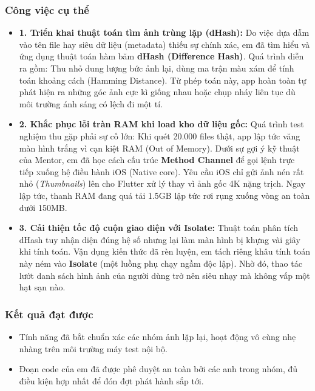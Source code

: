 \documentclass[12pt, a4paper]{article}
\begin{document}
\subsubsection{Công việc cụ thể}
\begin{itemize}
    \item \textbf{1. Triển khai thuật toán tìm ảnh trùng lặp (dHash):} 
    Do việc dựa dẫm vào tên file hay siêu dữ liệu (metadata) thiếu sự chính xác, em đã tìm hiểu và ứng dụng thuật toán hàm băm \textbf{dHash (Difference Hash)}. Quá trình diễn ra gồm: Thu nhỏ dung lượng bức ảnh lại, dùng ma trận màu xám để tính toán khoảng cách (Hamming Distance). Từ phép toán này, app hoàn toàn tự phát hiện ra những góc ảnh cực kì giống nhau hoặc chụp nháy liên tục dù môi trường ánh sáng có lệch đi một tí.
    
    \item \textbf{2. Khắc phục lỗi tràn RAM khi load kho dữ liệu gốc:} 
    Quá trình test nghiệm thu gặp phải sự cố lớn: Khi quét 20.000 files thật, app lập tức văng màn hình trắng vì cạn kiệt RAM (Out of Memory). Dưới sự gợi ý kỹ thuật của Mentor, em đã học cách cấu trúc \textbf{Method Channel} để gọi lệnh trực tiếp xuống hệ điều hành iOS (Native core). Yêu cầu iOS chỉ gửi ảnh nén rất nhỏ (\textit{Thumbnails}) lên cho Flutter xử lý thay vì ảnh gốc 4K nặng trịch. Ngay lập tức, thanh RAM đang quá tải 1.5GB lập tức rơi rụng xuống vòng an toàn dưới 150MB.

    \item \textbf{3. Cải thiện tốc độ cuộn giao diện với Isolate:}
    Thuật toán phân tích dHash tuy nhận diện đúng hệ số nhưng lại làm màn hình bị khựng vài giây khi tính toán. Vận dụng kiến thức đã rèn luyện, em tách riêng khâu tính toán này ném vào \textbf{Isolate} (một luồng phụ chạy ngầm độc lập). Nhờ đó, thao tác lướt danh sách hình ảnh của người dùng trở nên siêu nhạy mà không vấp một hạt sạn nào.
\end{itemize}

\subsubsection{Kết quả đạt được}
\begin{itemize}
    \item Tính năng đã bắt chuẩn xác các nhóm ảnh lặp lại, hoạt động vô cùng nhẹ nhàng trên môi trường máy test nội bộ.
    \item Đoạn code của em đã được phê duyệt an toàn bởi các anh trong nhóm, đủ điều kiện hợp nhất để đón đợt phát hành sắp tới.
\end{itemize}
\end{document}
